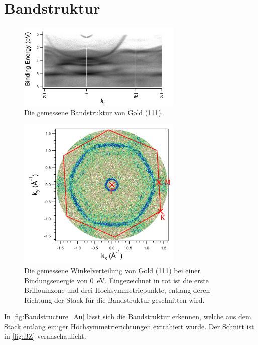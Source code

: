     \section{Bandstruktur}
        \begin{figure}
            \centering
            \includegraphics[width=0.7\textwidth]{./content/pictures/Bandstructure_Au111.png}
            \caption{Die gemessene Bandstruktur von Gold (111).}
            \label{fig:Bandstructure_Au}
        \end{figure}
        \begin{figure}
            \centering
            \includegraphics[width=0.7\textwidth]{./content/pictures/BZ}
            \caption{Die gemessene Winkelverteilung von Gold (111) bei einer Bindungsenergie von \SI{0}{\electronvolt}.
            Eingezeichnet in rot ist die erste Brillouinzone und drei Hochsymmetriepunkte, entlang deren Richtung der Stack für die Bandstruktur geschnitten wird.}
            \label{fig:BZ}
        \end{figure}
        In \autoref{fig:Bandstructure_Au} lässt sich die Bandstruktur erkennen, welche aus dem Stack entlang einiger Hochsymmetrierichtungen extrahiert wurde.
        Der Schnitt ist in \autoref{fig:BZ} veranschaulicht.


